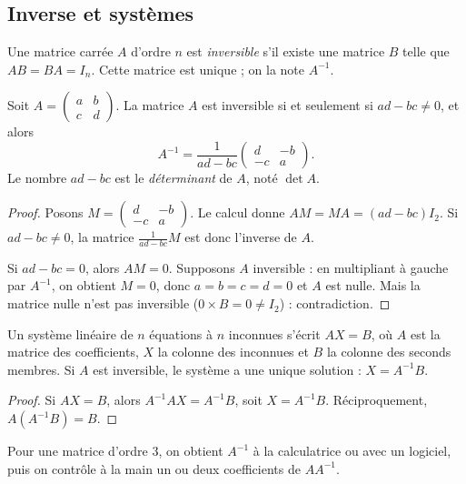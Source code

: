 \subsection{Inverse et systèmes}
\begin{definition}
Une matrice carrée $A$ d'ordre $n$ est \emph{inversible} s'il existe une matrice $B$ telle que $AB=BA=I_n$. Cette matrice est unique ; on la note $A^{-1}$.
\end{definition}
\begin{theorem}
Soit $A=\begin{pmatrix}a&b\\c&d\end{pmatrix}$. La matrice $A$ est inversible si et seulement si $ad-bc\neq0$, et alors
\[A^{-1}=\frac1{ad-bc}\begin{pmatrix}d&-b\\-c&a\end{pmatrix}.\]
Le nombre $ad-bc$ est le \emph{déterminant} de $A$, noté $\det A$.
\end{theorem}
\begin{proof}
Posons $M=\begin{pmatrix}d&-b\\-c&a\end{pmatrix}$. Le calcul donne $AM=MA=(ad-bc)I_2$. Si $ad-bc\neq0$, la matrice $\frac1{ad-bc}M$ est donc l'inverse de $A$.\par
Si $ad-bc=0$, alors $AM=0$. Supposons $A$ inversible : en multipliant à gauche par $A^{-1}$, on obtient $M=0$, donc $a=b=c=d=0$ et $A$ est nulle. Mais la matrice nulle n'est pas inversible ($0\times B=0\neq I_2$) : contradiction.
\end{proof}
\begin{theorem}
Un système linéaire de $n$ équations à $n$ inconnues s'écrit $AX=B$, où $A$ est la matrice des coefficients, $X$ la colonne des inconnues et $B$ la colonne des seconds membres. Si $A$ est inversible, le système a une unique solution : $X=A^{-1}B$.
\end{theorem}
\begin{proof}
Si $AX=B$, alors $A^{-1}AX=A^{-1}B$, soit $X=A^{-1}B$. Réciproquement, $A\left(A^{-1}B\right)=B$.
\end{proof}
\begin{method}
Pour une matrice d'ordre $3$, on obtient $A^{-1}$ à la calculatrice ou avec un logiciel, puis on contrôle à la main un ou deux coefficients de $AA^{-1}$.
\end{method}

